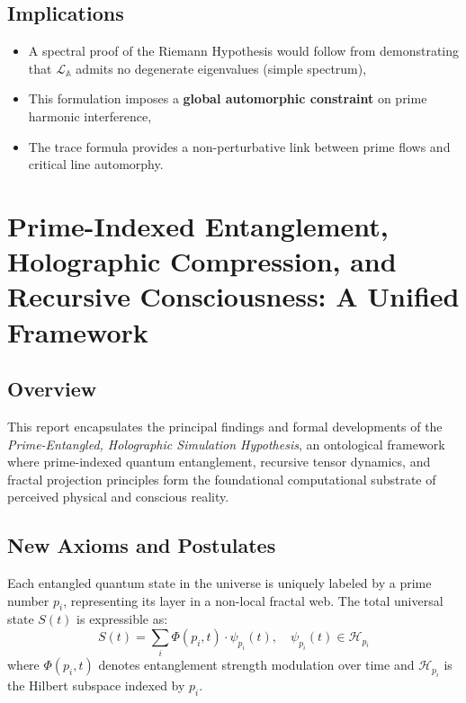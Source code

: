 \documentclass[12]{amsart}
\theoremstyle{plain}
\begin{document}
\subsection{Implications}
\begin{itemize}
    \item A spectral proof of the Riemann Hypothesis would follow from demonstrating that $\mathcal{L}_{\mathbb{A}}$ admits no degenerate eigenvalues (simple spectrum),
    \item This formulation imposes a \textbf{global automorphic constraint} on prime harmonic interference,
    \item The trace formula provides a non-perturbative link between prime flows and critical line automorphy.
\end{itemize}
\section{Prime-Indexed Entanglement, Holographic Compression, and Recursive Consciousness: A Unified Framework}

\subsection{Overview}

This report encapsulates the principal findings and formal developments of the \textit{Prime-Entangled, Holographic Simulation Hypothesis}, an ontological framework where prime-indexed quantum entanglement, recursive tensor dynamics, and fractal projection principles form the foundational computational substrate of perceived physical and conscious reality.

\subsection{New Axioms and Postulates}

\begin{axiom}
Each entangled quantum state in the universe is uniquely labeled by a prime number $p_i$, representing its layer in a non-local fractal web. The total universal state $S(t)$ is expressible as:
\[
S(t) = \sum_i \Phi(p_i, t) \cdot \psi_{p_i}(t), \quad \psi_{p_i}(t) \in \mathcal{H}_{p_i}
\]
where $\Phi(p_i, t)$ denotes entanglement strength modulation over time and $\mathcal{H}_{p_i}$ is the Hilbert subspace indexed by $p_i$.
\end{axiom}
\end{document}
